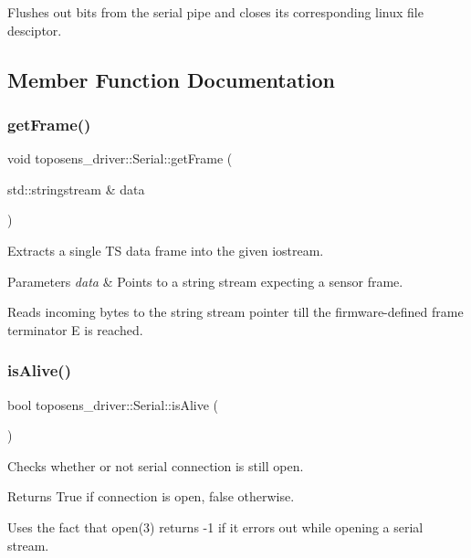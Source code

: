Flushes out bits from the serial pipe and closes its corresponding linux file desciptor. 

\subsection{Member Function Documentation}
\mbox{\label{classtoposens__driver_1_1Serial_a7e1ba7bccecbc978f6e16104ec459e29}} 
\subsubsection{\texorpdfstring{get\+Frame()}{getFrame()}}
{\footnotesize\ttfamily void toposens\+\_\+driver\+::\+Serial\+::get\+Frame (\begin{DoxyParamCaption}\item[{std\+::stringstream \&}]{data }\end{DoxyParamCaption})}

Extracts a single TS data frame into the given iostream. 
\begin{DoxyParams}{Parameters}
{\em data} & Points to a string stream expecting a sensor frame.\\
\hline
\end{DoxyParams}
Reads incoming bytes to the string stream pointer till the firmware-\/defined frame terminator \textquotesingle{}E\textquotesingle{} is reached. \mbox{\label{classtoposens__driver_1_1Serial_a43c68993fde1277eff277428d17b47c0}} 
\subsubsection{\texorpdfstring{is\+Alive()}{isAlive()}}
{\footnotesize\ttfamily bool toposens\+\_\+driver\+::\+Serial\+::is\+Alive (\begin{DoxyParamCaption}{ }\end{DoxyParamCaption})}

Checks whether or not serial connection is still open. \begin{DoxyReturn}{Returns}
True if connection is open, false otherwise.
\end{DoxyReturn}
Uses the fact that open(3) returns -\/1 if it errors out while opening a serial stream.

